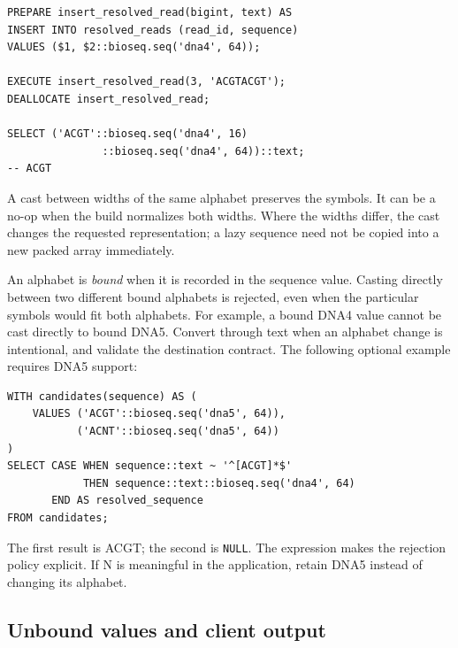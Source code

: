 \par\noindent\begin{minipage}{\linewidth}
\begin{lstlisting}[style=bioseq-appendix-sql]
PREPARE insert_resolved_read(bigint, text) AS
INSERT INTO resolved_reads (read_id, sequence)
VALUES ($1, $2::bioseq.seq('dna4', 64));

EXECUTE insert_resolved_read(3, 'ACGTACGT');
DEALLOCATE insert_resolved_read;

SELECT ('ACGT'::bioseq.seq('dna4', 16)
               ::bioseq.seq('dna4', 64))::text;
-- ACGT
\end{lstlisting}
\end{minipage}

A cast between widths of the same alphabet preserves the symbols. It can be
a no-op when the build normalizes both widths. Where the widths differ, the
cast changes the requested representation; a lazy sequence need not be
copied into a new packed array immediately.

An alphabet is \emph{bound} when it is recorded in the sequence value.
Casting directly between two different bound alphabets is rejected, even
when the particular symbols would fit both alphabets. For example, a bound
DNA4 value cannot be cast directly to bound DNA5. Convert through text when
an alphabet change is intentional, and validate the destination contract.
The following optional example requires DNA5 support:

\par\noindent\begin{minipage}{\linewidth}
\begin{lstlisting}[style=bioseq-appendix-sql]
WITH candidates(sequence) AS (
    VALUES ('ACGT'::bioseq.seq('dna5', 64)),
           ('ACNT'::bioseq.seq('dna5', 64))
)
SELECT CASE WHEN sequence::text ~ '^[ACGT]*$'
            THEN sequence::text::bioseq.seq('dna4', 64)
       END AS resolved_sequence
FROM candidates;
\end{lstlisting}
\end{minipage}

The first result is ACGT; the second is \texttt{NULL}. The expression makes
the rejection policy explicit. If N is meaningful in the application, retain
DNA5 instead of changing its alphabet.

\subsection{Unbound values and client output}

